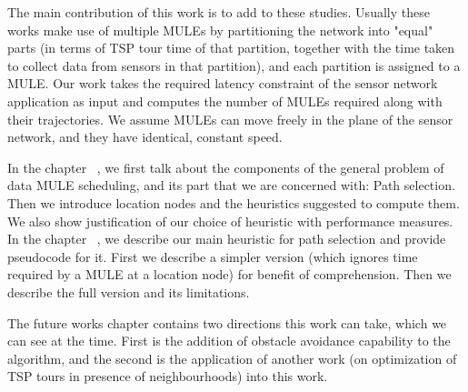 The main contribution of this work is to add to these studies. Usually these works make use of multiple MULEs by partitioning the network into "equal" parts (in terms of TSP tour time of that partition, together with the time taken to collect data from sensors in that partition), and each partition is assigned to a MULE. Our work takes the required latency constraint of the sensor network application as input and computes the number of MULEs required along with their trajectories. We assume MULEs can move freely in the plane of the sensor network, and they have identical, constant speed.

In the chapter ~, we first talk about the components of the general problem of data MULE scheduling, and its part that we are concerned with: Path selection. Then we introduce location nodes and the heuristics suggested to compute them. We also show justification of our choice of heuristic with performance measures. In the chapter ~, we describe our main heuristic for path selection and provide pseudocode for it. First we describe a simpler version (which ignores time required by a MULE at a location node) for benefit of comprehension. Then we describe the full version and its limitations.

The future works chapter contains two directions this work can take, which we can see at the time. First is the addition of obstacle avoidance capability to the algorithm, and the second is the application of another work (on optimization of TSP tours in presence of neighbourhoods) into this work.

